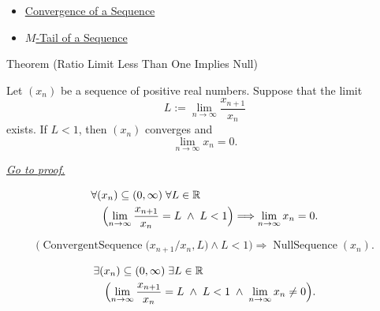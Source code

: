 \begin{remark*}[Dependencies]
\begin{itemize}
  \item \hyperref[def:convergent-sequence]{Convergence of a Sequence}
  \item \hyperref[def:m-tail]{$M$-Tail of a Sequence}
\end{itemize}
\end{remark*}



\begin{theorembox}{Theorem (Ratio Limit Less Than One Implies Null)}
\begin{theorem}
\label{thm:ratio-limit-less-than-one-implies-null}

Let $(x_n)$ be a sequence of positive real numbers. Suppose that the
limit
\[
    L := \lim_{n\to\infty}\frac{x_{n+1}}{x_n}
\]
exists. If $L<1$, then $(x_n)$ converges and
\[
    \lim_{n\to\infty} x_n = 0.
\]

\smallskip
\noindent
\hyperref[prf:ratio-limit-less-than-one-implies-null]{\textit{Go to proof.}}
\end{theorem}
\end{theorembox}

\begin{remark*}
\[
\begin{aligned}
&\forall (x_n)\subseteq (0,\infty)\;\forall L\in\mathbb{R}\\
&\quad\Bigl(
    \lim_{n\to\infty}\frac{x_{n+1}}{x_n}=L
    \;\land\;
    L<1
\Bigr)
\Longrightarrow
\lim_{n\to\infty}x_n=0.
\end{aligned}
\]
\end{remark*}

\begin{remark*}
\[
\bigl(
\operatorname{ConvergentSequence}\bigl(x_{n+1}/x_n,L\bigr)
\land
L<1
\bigr)
\Longrightarrow
\operatorname{NullSequence}(x_n).
\]
\end{remark*}

\begin{remark*}
\[
\begin{aligned}
&\exists (x_n)\subseteq (0,\infty)\;\exists L\in\mathbb{R}\\
&\quad\Bigl(
    \lim_{n\to\infty}\frac{x_{n+1}}{x_n}=L
    \;\land\;
    L<1
    \;\land\;
    \lim_{n\to\infty}x_n\neq 0
\Bigr).
\end{aligned}
\]
\end{remark*}

